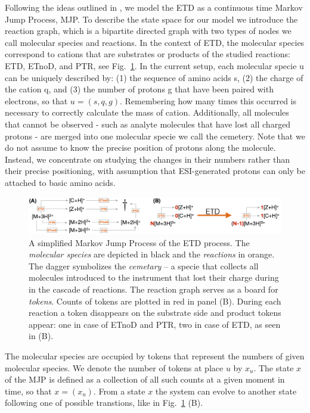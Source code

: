 \documentclass{llncs}
\begin{document}
        Following the ideas outlined in \cite{Gambin2010}, we model the ETD as a continuous time Markov Jump Process, MJP. To describe the state space for our model we introduce the reaction graph, which is a bipartite directed graph with two types of nodes we call molecular species and reactions. In the context of ETD, the molecular species correspond to cations that are substrates or products of the studied reactions: ETD, ETnoD, and PTR, see Fig.~\ref{img::petrinet}. In the current setup, each molecular specie u can be uniquely described by: (1) the sequence of amino acids s, (2) the charge of the cation q, and (3) the number of protons g that have been paired with electrons, so that $u = (s,q,g)$. Remembering how many times this occurred is necessary to correctly calculate the mass of cation.  Additionally, all molecules that cannot be observed - such as analyte molecules that have lost all charged protons - are merged into one molecular specie we call the cemetery. Note that we do not assume to know the precise position of protons along the molecule. Instead, we concentrate on studying the changes in their numbers rather than their precise positioning, with assumption that ESI-generated protons can only be attached to basic amino acids.
\begin{figure}[h]
        \center
        \includegraphics[width=\textwidth]{petrinet.png}
        \caption{A simplified Markov Jump Process of the ETD process. The \textit{molecular species} are depicted in black and the \textit{reactions} in orange. The dagger symbolizes the \textit{cemetary} -- a specie that collects all molecules introduced to the instrument that lost their charge during in the cascade of reactions. The reaction graph serves as a board for \textit{tokens}. Counts of tokens are plotted in red in panel (B). During each reaction a token disappears on the substrate side and product tokens appear: one in case of ETnoD and PTR, two in case of ETD, as seen in (B).}\label{img::petrinet}
\end{figure}

        The molecular species are occupied by tokens that represent the numbers of given molecular species. We denote the number of tokens at place $u$ by $x_u$. The state $x$ of the MJP is defined as a collection of all such counts at a given moment in time, so that $x = (x_u)$.  From a state $x$ the system can evolve to another state following one of possible transtions, like in Fig.~\ref{img::petrinet} (B).
\end{document}
